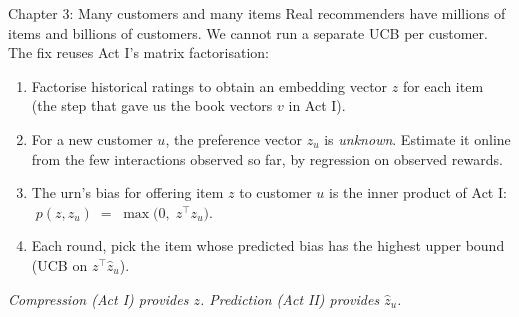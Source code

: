%

\begin{frame}{Chapter 3: Many customers and many items}
  \footnotesize
  Real recommenders have millions of items and billions of customers.
  We cannot run a separate UCB per customer.  The fix reuses Act I's
  matrix factorisation:

  \smallskip
  \begin{enumerate}
    \setlength{\itemsep}{0.2em}
    \item Factorise historical ratings to obtain an embedding vector
          $z$ for each item (the step that gave us the book vectors
          $v$ in Act I).
    \item For a new customer $u$, the preference vector $z_u$ is
          \emph{unknown}.  Estimate it online from the few interactions
          observed so far, by regression on observed rewards.
    \item The urn's bias for offering item $z$ to customer $u$ is the
          inner product of Act I:
          $\;p(z, z_u) \;=\; \max\!\big(0,\; z^\top z_u\big).$
    \item Each round, pick the item whose predicted bias has the
          highest upper bound (UCB on $z^\top \hat z_u$).
  \end{enumerate}

  \smallskip
  \begin{center}
    \scriptsize\itshape\color{mutedWarmGray}
    Compression (Act I) provides $z$.  Prediction (Act II) provides
    $\hat z_u$.
  \end{center}
\end{frame}

